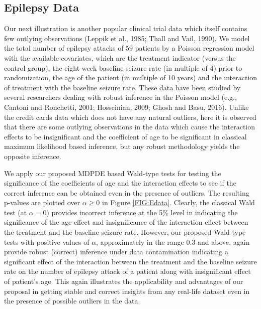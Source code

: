 \documentclass[a4paper]{article}%
\begin{document}
\subsection{Epilepsy Data}


Our next illustration is another popular clinical trial data which itself contains few outlying observations
(Leppik et al., 1985; Thall and Vail, 1990). 
We model the total number of epilepsy attacks of 59 patients by a Poisson regression model 
with the available covariates, which are the treatment indicator (versus the control group), 
the eight-week baseline seizure rate (in multiple of 4) prior to randomization, 
the age of the patient (in multiple of 10 years)
and the interaction of treatment with the baseline seizure rate.
These data have been studied by several researchers dealing with robust inference in the Poisson model 
(e.g., Cantoni and Ronchetti, 2001; Hosseinian, 2009; Ghosh and Basu, 2016).
Unlike the credit cards data which does not have any natural outliers, 
here it is observed that there are some outlying observations in the data 
which cause the interaction effects to be insignificant and the coefficient of age to be significant
in classical maximum likelihood based inference,
but any robust methodology yields the opposite inference. 





We apply our proposed MDPDE based Wald-type tests for testing the significance of the coefficients of age 
and the interaction effects to see if the correct inference can be obtained even in the presence of outliers.
The resulting p-values are plotted over $\alpha\geq 0$ in Figure \ref{FIG:Edata}.
Clearly, the classical Wald test (at $\alpha=0$) provides incorrect inference at the 5\% level  
in indicating the significance of the age effect and insignificance of the interaction effect between the treatment and the baseline seizure rate.
However, our proposed Wald-type tests with positive values of $\alpha$, approximately in the range 0.3 and above, 
again provide robust (correct) inference under data contamination
indicating a significant effect of the interaction between the treatment and  the baseline seizure rate 
on the number of epilepsy attack of a patient along with insignificant effect of patient's age.
This again illustrates the applicability and advantages of our proposal in getting stable and correct insights 
from any real-life dataset even in the presence of possible outliers in the data.
\end{document}

